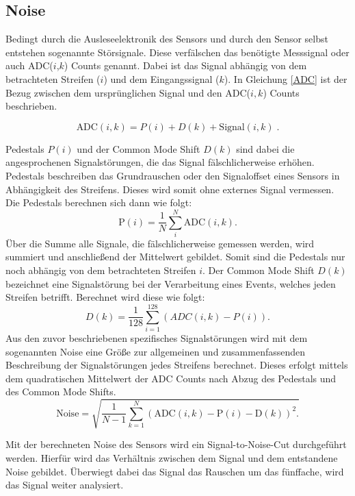 \subsection{Noise}
Bedingt durch die Ausleseelektronik des Sensors und durch den Sensor selbst entstehen sogenannte Störsignale. Diese verfälschen das benötigte Messsignal oder auch ADC($i$,$k$) Counts genannt. Dabei ist das Signal abhängig von dem betrachteten Streifen ($i$) und dem Eingangssignal ($k$). In Gleichung \ref{ADC} ist der Bezug zwischen dem ursprünglichen Signal und den ADC($i,k$) Counts beschrieben.

\begin{equation}
\label{ADC}
\text{ADC}(i,k)=P(i)+D(k)+\text{Signal}(i,k)\;.
\end{equation}

Pedestals $P(i)$ und der Common Mode Shift $D(k)$ sind dabei die angesprochenen Signalstörungen, die das Signal fälschlicherweise erhöhen. Pedestals beschreiben das Grundrauschen oder den Signaloffset eines Sensors in Abhängigkeit des Streifens. Dieses wird somit ohne externes Signal vermessen. Die Pedestals berechnen sich dann wie folgt:
\begin{equation}
    \label{peds}
    \text{P}(i)=\frac{1}{N}\sum_i^{N} \text{ADC}(i,k).
\end{equation}
Über die Summe alle Signale, die fälschlicherweise gemessen werden, wird summiert und anschließend der Mittelwert gebildet. Somit sind die Pedestals nur noch abhängig von dem betrachteten Streifen $i$. Der Common Mode Shift $D(k)$ bezeichnet eine Signalstörung bei der Verarbeitung eines Events, welches jeden Streifen betrifft. Berechnet wird diese wie folgt:
\begin{equation}
    \label{common}
    D(k)=\frac{1}{128}\sum_{i=1}^{128}(ADC(i,k)-P(i)).
\end{equation}
Aus den zuvor beschriebenen spezifisches Signalstörungen wird mit dem sogenannten Noise eine Größe zur allgemeinen und zusammenfassenden Beschreibung der Signalstörungen jedes Streifens berechnet. Dieses erfolgt mittels dem quadratischen Mittelwert der ADC Counts nach Abzug des Pedestals und des Common Mode Shifts.
\begin{equation}
    \label{noise}
    \text{Noise}=\sqrt{\frac{1}{N-1}\sum_{k=1}^{N}( \text{ADC}(i,k)-\text{P}(i)-\text{D}(k))^2. }
\end{equation}

Mit der berechneten Noise des Sensors wird ein Signal-to-Noise-Cut durchgeführt werden. Hierfür wird das Verhältnis zwischen dem Signal und dem entstandene Noise gebildet. Überwiegt dabei das Signal das Rauschen um das fünffache, wird das Signal weiter analysiert. 

